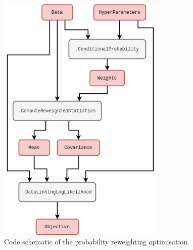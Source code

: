 \begin{figure}[h]
\centering
\includegraphics[width=8cm]{images/chapter-3-prob-reweighting-code.drawio.png}
\caption{Code schematic of the probability reweighting optimisation.}
\label{fig:prob-reweighting-code}
\end{figure} 

